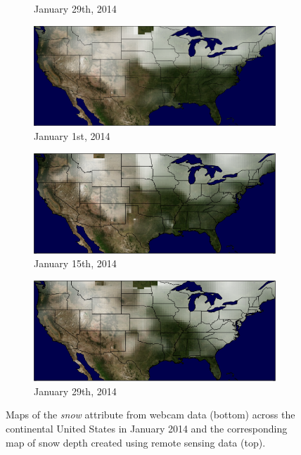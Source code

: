 \documentclass[10pt,twocolumn,letterpaper]{article}
\begin{document}
\begin{figure}
\begin{subfigure}[b]{0.33\textwidth}
    \caption{January 29th, 2014}
    \label{fig:snow_map_gt_3}
  \end{subfigure}
  \begin{subfigure}[b]{0.33\textwidth}
    \centering
		\includegraphics[width=\textwidth, trim= 0mm 0mm 0mm 0mm]{figs/snow_map_1.png}
    \caption{January 1st, 2014}
    \label{fig:snow_map_est_1}
  \end{subfigure}
  \begin{subfigure}[b]{0.33\textwidth}
    \centering
		\includegraphics[width=\textwidth, trim= 0mm 0mm 0mm 0mm]{figs/snow_map_2.png}
    \caption{January 15th, 2014}
    \label{fig:snow_map_est_2}
  \end{subfigure}
  \begin{subfigure}[b]{0.33\textwidth}
    \centering
		\includegraphics[width=\textwidth, trim= 0mm 0mm 0mm 0mm]{figs/snow_map_3.png}
    \caption{January 29th, 2014}
    \label{fig:snow_map_est_3}
  \end{subfigure}
  \caption{Maps of the \emph{snow} attribute from webcam data (bottom)
           across the continental United States in January 2014 and the
           corresponding map of snow depth created using remote 
           sensing data (top).\protect\footnotemark} 
  \label{fig:snow_maps}
\end{figure}
\end{document}
